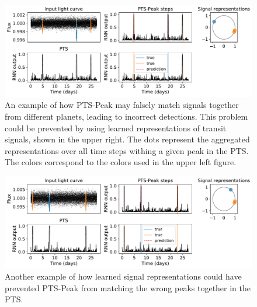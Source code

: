 \begin{figure}
    \centering
    \includegraphics[width=0.85\linewidth]{Experiments/Figures/Cases/sf_multi_peak_repr_3.pdf}
    \caption{An example of how PTS-Peak may falsely match signals together from different planets, leading to incorrect detections. This problem could be prevented by using learned representations of transit signals, shown in the upper right. The dots represent the aggregated representations over all time steps withing a given peak in the PTS. The colors correspond to the colors used in the upper left figure.}
    \label{fig:sf_repr_3}
\end{figure}


\begin{figure}
    \centering
    \includegraphics[width=0.85\linewidth]{Experiments/Figures/Cases/sf_multi_peak_repr_2.pdf}
    \caption{Another example of how learned signal representations could have prevented PTS-Peak from matching the wrong peaks together in the PTS.}
    \label{fig:sf_repr_2}
\end{figure}
